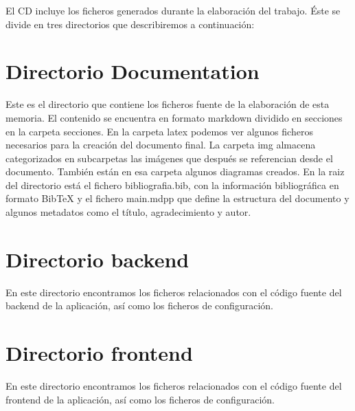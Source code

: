\documentclass[openright,twoside,10pt]{book}
\begin{document}
    El CD incluye los ficheros generados durante la elaboración del trabajo.
    Éste se divide en tres directorios que describiremos a continuación:
    
    \section{Directorio Documentation}\label{directorio-documentation}
    
    Este es el directorio que contiene los ficheros fuente de la elaboración
    de esta memoria. El contenido se encuentra en formato markdown dividido
    en secciones en la carpeta secciones. En la carpeta latex podemos ver
    algunos ficheros necesarios para la creación del documento final. La
    carpeta img almacena categorizados en subcarpetas las imágenes que
    después se referencian desde el documento. También están en esa carpeta
    algunos diagramas creados. En la raiz del directorio está el fichero
    bibliografia.bib, con la información bibliográfica en formato BibTeX y
    el fichero main.mdpp que define la estructura del documento y algunos
    metadatos como el título, agradecimiento y autor.
    
    \section{Directorio backend}\label{directorio-backend}
    
    En este directorio encontramos los ficheros relacionados con el código
    fuente del backend de la aplicación, así como los ficheros de
    configuración.
    
    \section{Directorio frontend}\label{directorio-frontend}
    
    En este directorio encontramos los ficheros relacionados con el código
    fuente del frontend de la aplicación, así como los ficheros de
    configuración.
    
    
    \nocite{*} \printbibliography

    \cleardoublepage

\end{document}
